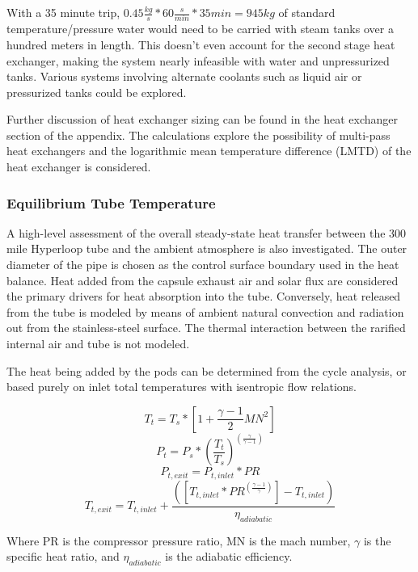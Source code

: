 \documentclass[heading.tex]{subfiles}
\begin{document}
With a 35 minute trip, $0.45 \frac{kg}{s} * 60 \frac{s}{min} * 35min = 945 kg$ of standard temperature/pressure water would need to be carried 
with steam tanks over a hundred meters in length. This doesn't even account for the second stage heat exchanger, making the system nearly infeasible
with water and unpressurized tanks. Various systems involving alternate coolants such as liquid air or pressurized tanks could be explored.

Further discussion of heat exchanger sizing can be found in the heat exchanger section of the appendix.
The calculations explore the possibility of multi-pass heat exchangers
and the logarithmic mean temperature difference (LMTD) of the heat exchanger is considered.

\subsubsection{Equilibrium Tube Temperature}
A high-level assessment of the overall steady-state heat transfer between the 300 mile Hyperloop tube and the ambient atmosphere is
also investigated. The outer diameter of the pipe is chosen as the control surface boundary used in the heat balance. Heat added from the capsule exhaust
air and solar flux are considered the primary drivers for heat absorption into the tube. Conversely, heat released from the tube is modeled by means of
ambient natural convection and radiation out from the stainless-steel surface. The thermal interaction between the rarified internal air and
tube is not modeled.

The heat being added by the pods can be determined from the cycle analysis, or based purely on inlet total temperatures with isentropic
flow relations.

\begin{equation*}
T_{t} = T_{s} * [1 + \frac{\gamma -1}{2} MN^2]
\end{equation*}
\begin{equation*}
P_{t} = P_{s} * (\frac{ T_{t}}{T_{s}})^(\frac{\gamma}{\gamma -1})
\end{equation*}
\begin{equation*}
P_{t,exit} = P_{t,inlet} * PR
\end{equation*}
\begin{equation*}
T_{t,exit} = T_{t,inlet} + \frac{([T_{t,inlet}*PR^{(\frac{\gamma-1}{\gamma})}] - T_{t,inlet})}  {{\eta}_{adiabatic}}
\end{equation*}

Where PR is the compressor pressure ratio, MN is the mach number,  $\gamma$ is the specific heat ratio, and  ${\eta}_{adiabatic}$ is the
adiabatic efficiency.
\end{document}

